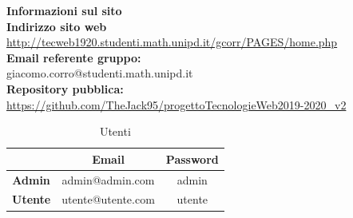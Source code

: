 \hspace{5pt}

\begin{center}
	\textbf{\Large{Informazioni sul sito}}\\
	\textbf{Indirizzo sito web} \\ \url{http://tecweb1920.studenti.math.unipd.it/gcorr/PAGES/home.php}\\
	\textbf{Email referente gruppo:} \\ giacomo.corro@studenti.math.unipd.it \\
	\textbf{Repository pubblica:} \\ \url{https://github.com/TheJack95/progettoTecnologieWeb2019-2020_v2}\\
	\renewcommand{\arraystretch}{1.8}
	\begin{longtable}[H]{c c c}
		\caption{Utenti}\\
		\rowcolor[HTML]{58c25d}
		\multicolumn{1}{c}{\color[HTML]{FFFFFF} \textbf{Utente}} &
		\multicolumn{1}{c}{\color[HTML]{FFFFFF} \textbf{Email}} &
		\multicolumn{1}{c}{\color[HTML]{FFFFFF} \textbf{Password}} \\
		\endhead
		\textbf{Admin} & admin@admin.com & admin\\
		\textbf{Utente} & utente@utente.com & utente\\
	\end{longtable}
\end{center}